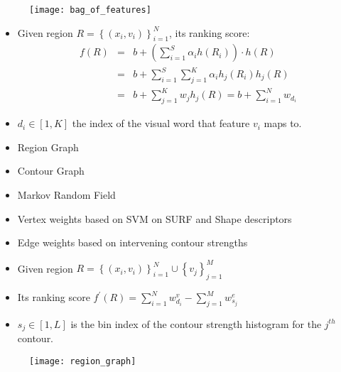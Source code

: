 \documentclass[11pt, a4paper, landscape]{article}
\begin{document}
\NewPage{}
\vfill
\begin{figure}
	\centering
	\texttt{[image: bag\_of\_features]}
\end{figure}
\begin{itemize}
\item Given region $R = \left\lbrace (x_i, v_i) \right\rbrace _{i = 1} ^N$, its ranking score:
\begin{equation*}
\begin{array}{lcl}
f(R) & = & b + (\sum\limits_{i = 1}^{S}\alpha_ih(R_i)) \cdot h(R)\\
     & = & b + \sum\limits_{i = 1}^{S}\sum\limits_{j = 1}^{K} \alpha_ih_j(R_i)h_j(R)\\
     & = & b + \sum\limits_{j = 1}^{K} w_jh_j(R) = b + \sum\limits_{i = 1}^{N} w_{d_i}
\end{array}
\end{equation*}
\item $d_i \in \left[ 1, K \right] $ the index of the visual word that feature $v_i$ maps to.
\end{itemize}
\vfill


\NewPage{}
\vfill
\begin{itemize}
\item Region Graph
\vfill
\item Contour Graph
\vfill
\item Markov Random Field
\end{itemize}
\vfill


\NewPage{}
\vfill
\begin{itemize}
\item Vertex weights based on SVM on SURF and Shape descriptors
\item Edge weights based on intervening contour strengths
\item Given region $R = \left\lbrace (x_i, v_i) \right\rbrace _{i = 1} ^N \cup \left\lbrace v_j \right\rbrace _{j = 1} ^M$
\item Its ranking score $f^{\prime}(R) = \sum\limits_{i = 1}^{N}w^v_{d_i} - \sum\limits_{j = 1}^{M} w^e_{s_j}$
\item $s_j \in \left[ 1, L \right] $ is the bin index of the contour strength histogram for the $j^{th}$ contour.
\end{itemize}
\begin{figure}
	\centering
	\texttt{[image: region\_graph]}
\end{figure}
\vfill
\end{document}
